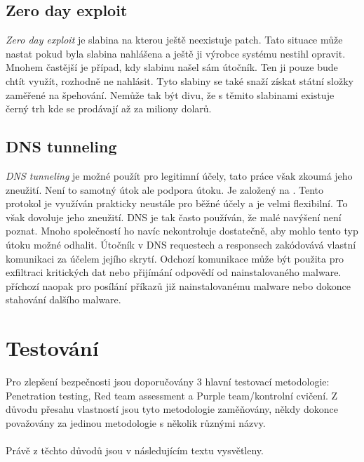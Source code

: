 \subsection{Zero day exploit}
\textit{Zero day exploit} je slabina na kterou ještě neexistuje patch.
Tato situace může nastat pokud byla slabina nahlášena a ještě ji výrobce systému nestihl opravit.
Mnohem častější je případ, kdy slabinu našel sám útočník.
Ten ji pouze bude chtít využít, rozhodně ne nahlásit.
Tyto slabiny se také snaží získat státní složky zaměřené na špehování.
Nemůže tak být divu, že s těmito slabinami existuje černý trh\cite{world_end_2021} kde se prodávají až za miliony dolarů.

\subsection{DNS tunneling}
\textit{DNS tunneling} je možné použít pro legitimní účely, tato práce však zkoumá jeho zneužití.
Není to samotný útok ale podpora útoku.
Je založený na .
Tento protokol je využíván prakticky neustále pro běžné účely a je velmi flexibilní.
To však dovoluje jeho zneužití.
\ac{DNS} je tak často používán, že malé navýšení není poznat.
Mnoho společností ho navíc nekontroluje dostatečně, aby mohlo tento typ útoku možné odhalit.
Útočník v \ac{DNS} requestech a responsech zakódovává vlastní komunikaci za účelem jejího skrytí.
Odchozí komunikace může být použita pro exfiltraci kritických dat nebo přijímání odpovědí od nainstalovaného malware.
příchozí naopak pro posílání příkazů již nainstalovanému malware nebo dokonce stahování dalšího malware.\cite{cisco_most_common_attack, bright_sec_dns_tunneling}


\section{Testování}
Pro zlepšení bezpečnosti jsou doporučovány 3 hlavní testovací metodologie: Penetration testing, Red team assessment a Purple team/kontrolní cvičení.
Z důvodu přesahu vlastností jsou tyto metodologie zaměňovány, někdy dokonce považovány za jedinou metodologie s několik různými názvy.\cite{securityInteligence_pen_test_red_team_purple_team}

\paragraph{}
Právě z těchto důvodů jsou v následujícím textu vysvětleny.

